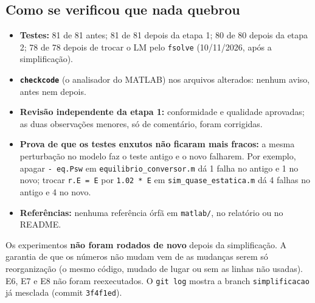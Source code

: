 \subsection{Como se verificou que nada quebrou}

\begin{itemize}
\item \textbf{Testes:} 81 de 81 antes; 81 de 81 depois da etapa 1; 80 de 80 depois da etapa 2; 78 de 78 depois de trocar o LM pelo \texttt{fsolve} (10/11/2026, ap\'os a simplifica\c{c}\~ao).
\item \textbf{\texttt{checkcode}} (o analisador do MATLAB) nos arquivos alterados: nenhum aviso, antes nem depois.
\item \textbf{Revis\~ao independente da etapa 1:} conformidade e qualidade aprovadas; as duas observa\c{c}\~oes menores, s\'o de coment\'ario, foram corrigidas.
\item \textbf{Prova de que os testes enxutos n\~ao ficaram mais fracos:} a mesma perturba\c{c}\~ao no modelo faz o teste antigo e o novo falharem. Por exemplo, apagar \texttt{- eq.Psw} em \texttt{equilibrio\_conversor.m} d\'a 1 falha no antigo e 1 no
 novo; trocar \texttt{r.E = E} por \texttt{1.02 * E} em \texttt{sim\_quase\_estatica.m} d\'a 4 falhas no antigo e 4 no novo.
\item \textbf{Refer\^encias:} nenhuma refer\^encia \'orf\~a em \texttt{matlab/}, no relat\'orio ou no README.
\end{itemize}

\begin{atencao}
Os experimentos \textbf{n\~ao foram rodados de novo} depois da simplifica\c{c}\~ao. A garantia de que os n\'umeros n\~ao mudam vem de as mudan\c{c}as serem s\'o reorganiza\c{c}\~ao (o mesmo c\'odigo, mudado de lugar ou sem as linhas n\~ao
usadas). E6, E7 e E8 n\~ao foram reexecutados. O \texttt{git log} mostra a branch \texttt{simplificacao} j\'a mesclada (commit \texttt{3f4f1ed}).
\end{atencao}
